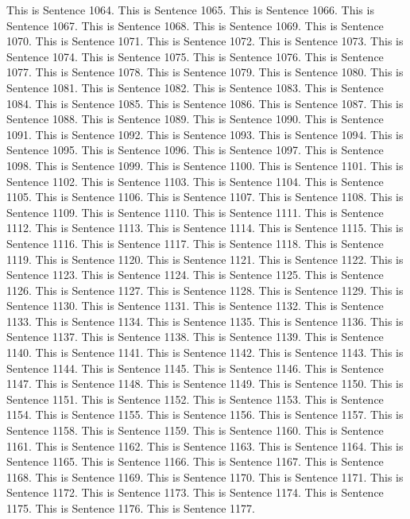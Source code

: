 \documentclass{article}
\begin{document}
This is Sentence 1064.
This is Sentence 1065.
This is Sentence 1066.
This is Sentence 1067.
This is Sentence 1068.
This is Sentence 1069.
This is Sentence 1070.
This is Sentence 1071.
This is Sentence 1072.
This is Sentence 1073.
This is Sentence 1074.
This is Sentence 1075.
This is Sentence 1076.
This is Sentence 1077.
This is Sentence 1078.
This is Sentence 1079.
This is Sentence 1080.
This is Sentence 1081.
This is Sentence 1082.
This is Sentence 1083.
This is Sentence 1084.
This is Sentence 1085.
This is Sentence 1086.
This is Sentence 1087.
This is Sentence 1088.
This is Sentence 1089.
This is Sentence 1090.
This is Sentence 1091.
This is Sentence 1092.
This is Sentence 1093.
This is Sentence 1094.
This is Sentence 1095.
This is Sentence 1096.
This is Sentence 1097.
This is Sentence 1098.
This is Sentence 1099.
This is Sentence 1100.
This is Sentence 1101.
This is Sentence 1102.
This is Sentence 1103.
This is Sentence 1104.
This is Sentence 1105.
This is Sentence 1106.
This is Sentence 1107.
This is Sentence 1108.
This is Sentence 1109.
This is Sentence 1110.
This is Sentence 1111.
This is Sentence 1112.
This is Sentence 1113.
This is Sentence 1114.
This is Sentence 1115.
This is Sentence 1116.
This is Sentence 1117.
This is Sentence 1118.
This is Sentence 1119.
This is Sentence 1120.
This is Sentence 1121.
This is Sentence 1122.
This is Sentence 1123.
This is Sentence 1124.
This is Sentence 1125.
This is Sentence 1126.
This is Sentence 1127.
This is Sentence 1128.
This is Sentence 1129.
This is Sentence 1130.
This is Sentence 1131.
This is Sentence 1132.
This is Sentence 1133.
This is Sentence 1134.
This is Sentence 1135.
This is Sentence 1136.
This is Sentence 1137.
This is Sentence 1138.
This is Sentence 1139.
This is Sentence 1140.
This is Sentence 1141.
This is Sentence 1142.
This is Sentence 1143.
This is Sentence 1144.
This is Sentence 1145.
This is Sentence 1146.
This is Sentence 1147.
This is Sentence 1148.
This is Sentence 1149.
This is Sentence 1150.
This is Sentence 1151.
This is Sentence 1152.
This is Sentence 1153.
This is Sentence 1154.
This is Sentence 1155.
This is Sentence 1156.
This is Sentence 1157.
This is Sentence 1158.
This is Sentence 1159.
This is Sentence 1160.
This is Sentence 1161.
This is Sentence 1162.
This is Sentence 1163.
This is Sentence 1164.
This is Sentence 1165.
This is Sentence 1166.
This is Sentence 1167.
This is Sentence 1168.
This is Sentence 1169.
This is Sentence 1170.
This is Sentence 1171.
This is Sentence 1172.
This is Sentence 1173.
This is Sentence 1174.
This is Sentence 1175.
This is Sentence 1176.
This is Sentence 1177.
\end{document}
